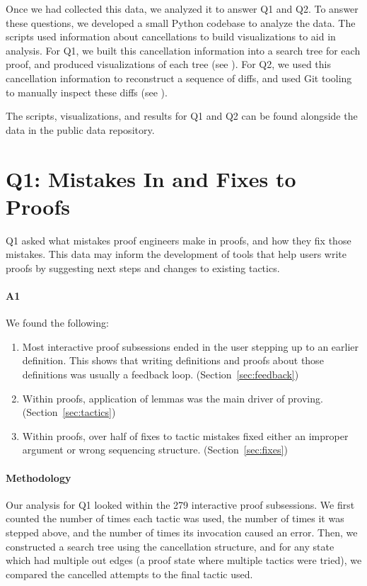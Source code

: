 Once we had collected this data, we analyzed it to answer Q1 and Q2.
To answer these questions, we developed a small Python
codebase to analyze the data.
The scripts used information about cancellations
to build visualizations to aid in analysis.
For Q1, we built this cancellation information into a search tree for
each proof, and produced visualizations of each tree
(see ).
For Q2, we used this cancellation
information to reconstruct a sequence of diffs, and used Git tooling
to manually inspect these diffs (see ).

The scripts, visualizations, and results for Q1 and Q2 can
be found alongside the data in the public data repository. 

\section{Q1: Mistakes In and Fixes to Proofs}
\label{sec:q1}

Q1 asked what mistakes proof engineers
make in proofs, and how they fix those mistakes.
This data may inform the development of tools
that help users write proofs
by suggesting next steps and changes to existing tactics.

\paragraph{A1}
We found the following:

\begin{enumerate}
\item Most interactive proof subsessions ended
  in the user stepping up to an earlier definition.
This shows that writing definitions and proofs about those definitions was
usually a feedback loop. (Section~\ref{sec:feedback})
\item Within proofs, application of lemmas
was the main driver of proving. (Section~\ref{sec:tactics})
\item Within proofs, over half of fixes to tactic mistakes
fixed either an improper argument or wrong sequencing structure.
(Section~\ref{sec:fixes})
\end{enumerate}

\paragraph{Methodology}
Our analysis for Q1 looked within the 279 interactive proof subsessions.
We first counted the number of times each tactic was used, the number
of times it was stepped above, and the number of times its invocation
caused an error. Then, we constructed a search tree using the
cancellation structure, and for any state which had multiple out edges
(a proof state where multiple tactics were tried), we compared the
cancelled attempts to the final tactic used.

